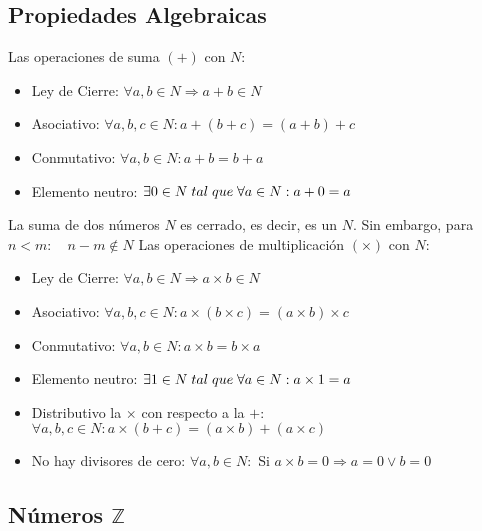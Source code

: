    \subsection{Propiedades Algebraicas}
   Las operaciones de suma $(+)$ con $N$: 
      \begin{itemize}
	 \item Ley de Cierre: $\forall a, b \in N \Rightarrow a+b \in N$ 
	 \item Asociativo: $\forall a,b,c \in N: a+(b+c)=(a+b)+c $
	 \item Conmutativo: $\forall a,b \in N: a+b=b+a$
	 \item Elemento neutro: $\exists 0 \in N \thickspace tal \thickspace que \thickspace \forall a \in N: a+0=a$
       \end{itemize}
      La suma de dos n\'umeros $N$ es cerrado, es decir, es un $N$. Sin embargo, para $n < m: \quad n-m \notin N$ \newline
      Las operaciones de multiplicaci\'on $(\times)$ con $N$:
      \begin{itemize}
	 \item Ley de Cierre: $\forall a, b \in N \Rightarrow a \times b \in N$
	 \item Asociativo: $\forall a,b,c \in N: a \times(b \times c)=(a \times b) \times c $
	 \item Conmutativo: $\forall a,b \in N: a \times b = b \times a $
	 \item Elemento neutro: $\exists 1 \in N \thickspace tal \thickspace que \thickspace \forall a \in N: a \times 1= a$
	 \item Distributivo la $\times$ con respecto a la $+$: $\forall a,b,c \in N: a \times (b+c)= (a \times b) + (a \times c)$
	 \item No hay divisores de cero:  $ \forall a,b \in N:$ Si $a \times b = 0 \Rightarrow a=0 \vee b=0$ 
      \end{itemize}

\subsection{Números $\mathbb{Z}$}
